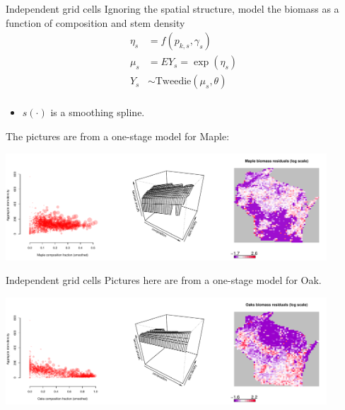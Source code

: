 \documentclass{beamer}
\begin{document}
\begin{frame}{Independent grid cells}
  Ignoring the spatial structure, model the biomass as a function of composition and stem density\\
  \begin{align*}
    \eta_s &= f(p_{k,s}, \gamma_s)\\
    \mu_s &= EY_s = \exp{(\eta_s)}\\
    Y_s &\sim \text{Tweedie}(\mu_s, \theta)\\
  \end{align*}
  \begin{itemize}
    \item $s(\cdot)$ is a smoothing spline.
  \end{itemize}

\end{frame}

\begin{frame}
  The pictures are from a one-stage model for Maple:\\
  \begin{center}
    \includegraphics[width=0.9\textwidth]{../../figures/aspatial-tweedie/Maple-plots.pdf}
  \end{center}
\end{frame}

\begin{frame}{Independent grid cells}
 Pictures here are from a one-stage model for Oak.\\
  \begin{center}
    \includegraphics[width=0.9\textwidth]{../../figures/aspatial-tweedie/Oaks-plots.pdf}
  \end{center}
\end{frame}
\end{document}

